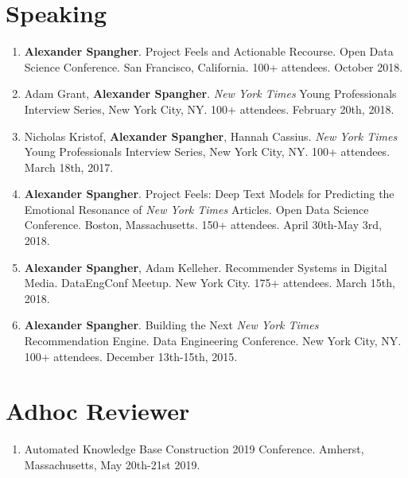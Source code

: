 \documentclass[margin]{res}
\begin{document}
\begin{resume}
\section{Speaking}
\begin{enumerate}
	\item \textbf{Alexander Spangher}. Project Feels and Actionable Recourse. Open Data Science Conference. San Francisco, California. 100+ attendees. October 2018.
	\item Adam Grant, \textbf{Alexander Spangher}. \textit{New York Times} Young Professionals Interview Series, New York City, NY. 100+ attendees. February 20th, 2018.
	\item Nicholas Kristof, \textbf{Alexander Spangher}, Hannah Cassius. \textit{New York Times} Young Professionals Interview Series, New York City, NY. 100+ attendees. March 18th, 2017.
	\item \textbf{Alexander Spangher}. Project Feels: Deep Text Models for Predicting the Emotional Resonance of \textit{New York Times} Articles. Open Data Science Conference. Boston, Massachusetts. 150+ attendees. April 30th-May 3rd, 2018.
	\item \textbf{Alexander Spangher}, Adam Kelleher. Recommender Systems in Digital Media. DataEngConf Meetup. New York City. 175+ attendees. March 15th, 2018.
	\item \textbf{Alexander Spangher}. Building the Next \textit{New York Times} Recommendation Engine. Data Engineering Conference. New York City, NY. 100+ attendees. December 13th-15th, 2015.
\end{enumerate}

\section{Adhoc Reviewer}
\begin{enumerate}
	\item Automated Knowledge Base Construction  2019 Conference. Amherst, Massachusetts, May 20th-21st 2019.
\end{enumerate}


\end{resume}
\end{document}
